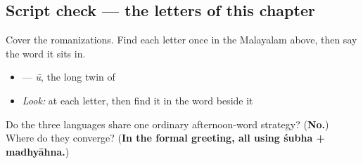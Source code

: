 \subsection*{Script check — the letters of this chapter}
Cover the romanizations. Find each letter once in the Malayalam above, then say the word it sits in.

\begin{itemize}
\raggedright
  \item \textbf{} — \textbf{} \emph{ū}, the long twin of \textbf{}
\end{itemize}

\begin{itemize}
\raggedright
  \item \emph{Look:} at each letter, then find it in the word beside it
\end{itemize}

\begin{tcolorbox}[breakable,colback=teal!4,colframe=teal!35!black,title={Before you move on}]
Do the three languages share one ordinary afternoon-word strategy? (\textbf{No.}) Where do they converge? (\textbf{In the formal greeting, all using śubha + madhyāhna.})
\end{tcolorbox}
